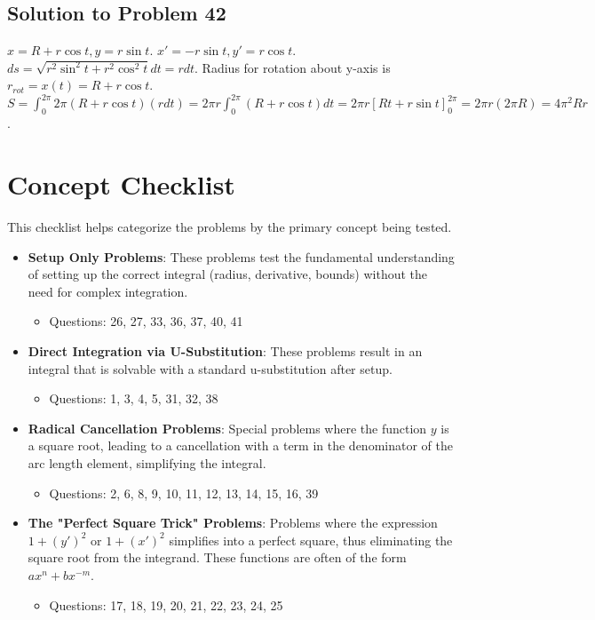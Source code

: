 \documentclass[12pt]{article}
\begin{document}
\subsection*{Solution to Problem 42}
$x=R+r\cos t, y=r\sin t$. $x'=-r\sin t, y'=r\cos t$. $ds=\sqrt{r^2\sin^2t+r^2\cos^2t}dt = r dt$.
Radius for rotation about y-axis is $r_{rot}=x(t)=R+r\cos t$.
$S=\int_0^{2\pi} 2\pi(R+r\cos t)(r dt) = 2\pi r \int_0^{2\pi}(R+r\cos t)dt = 2\pi r [Rt+r\sin t]_0^{2\pi} = 2\pi r(2\pi R) = 4\pi^2Rr$.

\newpage
\section*{Concept Checklist}
This checklist helps categorize the problems by the primary concept being tested.

\begin{itemize}
    \item \textbf{Setup Only Problems}: These problems test the fundamental understanding of setting up the correct integral (radius, derivative, bounds) without the need for complex integration.
    \begin{itemize}
        \item Questions: 26, 27, 33, 36, 37, 40, 41
    \end{itemize}

    \item \textbf{Direct Integration via U-Substitution}: These problems result in an integral that is solvable with a standard u-substitution after setup.
    \begin{itemize}
        \item Questions: 1, 3, 4, 5, 31, 32, 38
    \end{itemize}

    \item \textbf{Radical Cancellation Problems}: Special problems where the function $y$ is a square root, leading to a cancellation with a term in the denominator of the arc length element, simplifying the integral.
    \begin{itemize}
        \item Questions: 2, 6, 8, 9, 10, 11, 12, 13, 14, 15, 16, 39
    \end{itemize}

    \item \textbf{The "Perfect Square Trick" Problems}: Problems where the expression $1+(y')^2$ or $1+(x')^2$ simplifies into a perfect square, thus eliminating the square root from the integrand. These functions are often of the form $ax^n + bx^{-m}$.
    \begin{itemize}
        \item Questions: 17, 18, 19, 20, 21, 22, 23, 24, 25
    \end{itemize}


\end{itemize}
\end{document}
